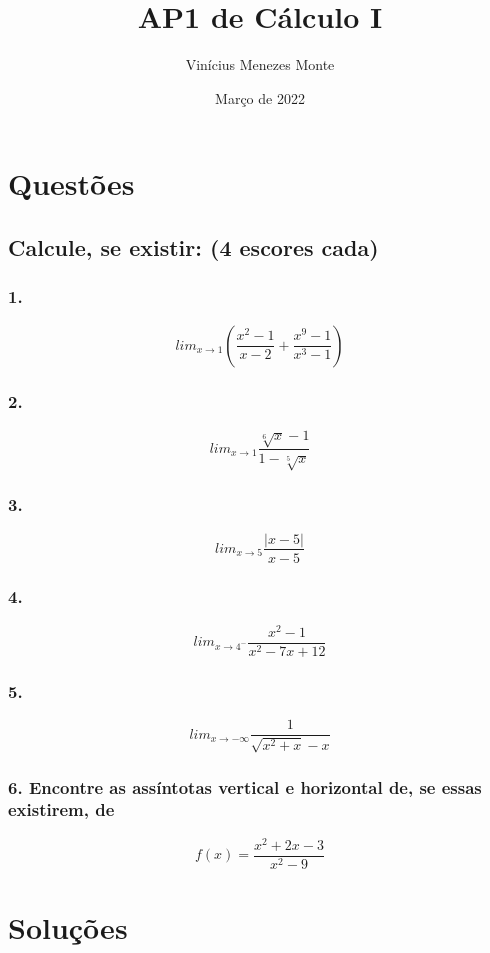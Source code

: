 \documentclass{article}
\title{AP1 de Cálculo I}
\author{Vinícius Menezes Monte}
\date{Março de 2022}
\begin{document}
\maketitle

\section*{Questões}
\subsection*{Calcule, se existir: (4 escores cada)}
\subsubsection*{1.}

\[
    lim_{x\to 1} \left(\frac{x^2-1}{x-2}+\frac{x^9-1}{x^3-1}\right)
\]

\subsubsection*{2.}

\[
    lim_{x\to 1} \frac{\sqrt[6]{x}-1}{1-\sqrt[5]{x}}
\]

\subsubsection*{3.}

\[
    lim_{x\to 5} \frac{|x-5|}{x-5}
\]

\subsubsection*{4.}

\[
    lim_{x\to 4^-} \frac{x^2-1}{x^2-7x+12}
\]

\subsubsection*{5.}

\[
    lim_{x\to -\infty} \frac{1}{\sqrt{x^2+x}-x}
\]

\subsubsection*{6. Encontre as assíntotas vertical e horizontal de, se essas existirem, de}

\[
    f(x) = \frac{x^2+2x-3}{x^2-9}
\]


\section*{Soluções}
\end{document}
